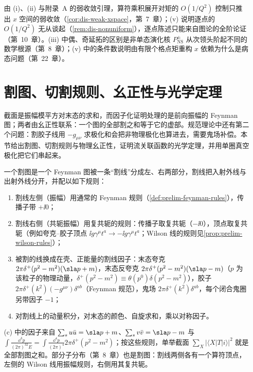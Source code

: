 由 (i)、(ii) 与附录~A 的弱收敛引理，算符乘积展开对矩的 $O(1/Q^2)$ 控制只推出 $x$ 空间的弱收敛（\cref{cor:dis-weak-xspace}，第~7~章）；(v) 说明逐点的 $O(1/Q^2)$ 无从谈起（\cref{rem:dis-nonuniform}），逐点陈述只能来自图论的全阶论证（第~10~章）。(iii) 中偶、奇延拓的区别是非单态演化核 $P^\pm_{\mathrm{NS}}$ 从次领头阶起不同的数学根源（第~8~章）；(v) 中的条件数说明由有限个格点矩重构 $x$ 依赖为什么是病态问题（第~22~章）。
\section{割图、切割规则、幺正性与光学定理}\label{sec:prelim-cuts}

截面是振幅模平方对末态的求和，而因子化证明处理的是前向振幅的 Feynman 图；两者由幺正性联系：一个图的全部割之和等于它的虚部。规范理论中还有第二个问题：割胶子线用 $-g_{\mu\nu}$ 求极化和会把非物理极化也算进去，需要鬼场补偿。本节给出割图、切割规则与物理幺正性，证明流关联函数的光学定理，并用单圈真空极化把它们串起来。

\begin{definition}[割图]\label{def:prelim-cut}
一个割图是一个 Feynman 图被一条“割线”分成左、右两部分，割线把入射外线与出射外线分开，并配以如下规则：
\begin{enumerate}[label=(\alph*),leftmargin=2.2em,itemsep=0pt,topsep=2pt]
\item 割线左侧（振幅）用通常的 Feynman 规则（\cref{def:prelim-feynman-rules}），传播子带 $+\ii0$；
\item 割线右侧（共轭振幅）用复共轭的规则：传播子取复共轭（$-\ii0$），顶点取复共轭（例如夸克--胶子顶点 $\ii g\gamma^\mu t^a\to-\ii g\gamma^\mu t^a$；Wilson 线的规则见\cref{prop:prelim-wilson-rules}）；
\item 被割的线换成在壳、正能量的割线因子：末态夸克 $2\pi\delta^+(p^2-m^2)(\sla p+m)$，末态反夸克 $2\pi\delta^+(p^2-m^2)(\sla p-m)$（$p$ 为该粒子的物理动量，$\delta^+(p^2-m^2)\equiv\theta(p^0)\delta(p^2-m^2)$），胶子 $2\pi\delta^+(k^2)(-g^{\mu\nu})\delta^{ab}$（Feynman 规范），鬼场 $2\pi\delta^+(k^2)\delta^{ab}$，每个闭合鬼圈另带因子 $-1$；
\item 对割线上的动量积分，对末态的颜色、自旋求和，乘以对称因子。
\end{enumerate}
\end{definition}

(c) 中的因子来自 $\sum_su\bar u=\sla p+m$、$\sum_sv\bar v=\sla p-m$ 与 $\int\frac{\dd^3p}{(2\pi)^32E}=\int\frac{\dd^4p}{(2\pi)^4}2\pi\delta^+(p^2-m^2)$；按这些规则，单举截面 $\sum_X|\langle X|T|i\rangle|^2$ 就是全部割图之和。部分子分布（第~8~章）也是割图：割线两侧各有一个算符顶点，左侧的 Wilson 线用振幅规则，右侧用其复共轭。


